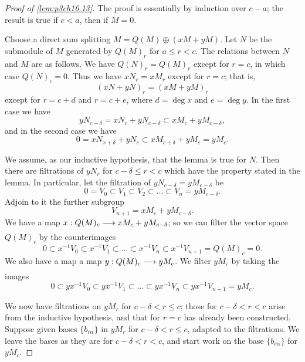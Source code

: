 \documentclass[../main]{subfiles}
\begin{document}
\begin{proof}[Proof of \ref{lem:p3ch16.13}]
The proof is essentially by induction over $c - a$; the result is true if $c < a$, then if $M = 0$.

Choose a direct sum splitting $M = Q(M) \oplus (xM + y M)$. Let $N$ be the submodule of $M$ generated by $Q(M)_r$ for $a \le r < c$. The relations between $N$ and $M$ are as follows. We have $Q(N)_r = Q(M)_r$ except for $r = c$, in which case $Q(N)_c = 0$. Thus we have $x N_r = x M_r$ except for $r = c$; that is, \[(x N + y N)_r = (x M + y M)_r\] except for $r = c + d$ and $r = c + e$, where $d = \deg x$ and $e = \deg y$. In the first case we have \[y N_{c - \delta} = x N_c + y N_{c - \delta} \subset x M_c + y M_{c - \delta}, \] and in the second case we have \[0 = x N_{x + \delta} + y N_c \subset x M_{c + \delta} + y M_c = y M_c.\] 

We assume, as our inductive hypothesis, that the lemma is true for $N$. Then there are filtrations of $y N_r$ for $c - \delta \le r < c$ which have the property stated in the lemma. In particular, let the filtration of $y N_{c - \delta} = y M_{c - \delta}$ be \[0 = V_0 \subset V_1 \subset V_2 \subset \ldots \subset V_n = y M_{c - \delta}.\] Adjoin to it the further subgroup \[V_{n + 1} = x M_c + y M_{c - \delta}.\] We have a map $x : Q(M)_c \lar{} x M_c + y M_{c - \delta}$; so we can filter the vector space $Q(M)_c$ by the counterimages \[0 \subset x^{-1} V_0 \subset x^{-1} V_1 \subset \ldots \subset x^{-1} V_n \subset x^{-1} V_{n + 1} = Q(M)_c = 0.\] We also have a map a map $y : Q(M)_c \lar{} y M_c$. We filter $y M_c$ by taking the images \[0 \subset y x^{-1} V_0 \subset y x^{-1} V_1 \subset \ldots \subset y x^{-1} V_n \subset y x^{-1} V_{n + 1} = y M_c.\]

We now have filtrations on $y M_r$ for $c - \delta < r \le c$; those for $c - \delta < r < c$ arise from the inductive hypothesis, and that for $r = c$ has already been constructed. Suppose given bases $\{b_{r \alpha}\}$ in $y M_r$ for $c - \delta < r \le c$, adapted to the filtrations. We leave the bases as they are for $c - \delta < r < c$, and start work on the base $\{b_{c \alpha}\}$ for $y M_c$. 


\end{proof}
\end{document}
